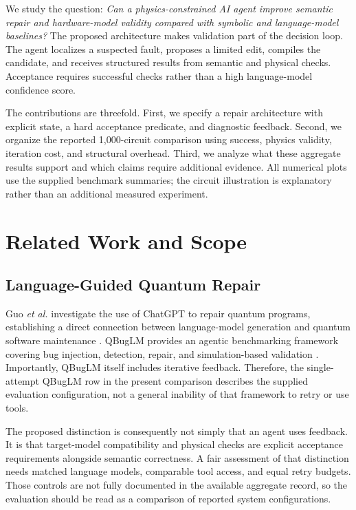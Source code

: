 \documentclass[conference]{IEEEtran}
\begin{document}
We study the question: \emph{Can a physics-constrained AI agent improve semantic repair and hardware-model validity compared with symbolic and language-model baselines?} The proposed architecture makes validation part of the decision loop. The agent localizes a suspected fault, proposes a limited edit, compiles the candidate, and receives structured results from semantic and physical checks. Acceptance requires successful checks rather than a high language-model confidence score.

The contributions are threefold. First, we specify a repair architecture with explicit state, a hard acceptance predicate, and diagnostic feedback. Second, we organize the reported 1,000-circuit comparison using success, physics validity, iteration cost, and structural overhead. Third, we analyze what these aggregate results support and which claims require additional evidence. All numerical plots use the supplied benchmark summaries; the circuit illustration is explanatory rather than an additional measured experiment.

\section{Related Work and Scope}
\subsection{Language-Guided Quantum Repair}
Guo \emph{et al.} investigate the use of ChatGPT to repair quantum programs, establishing a direct connection between language-model generation and quantum software maintenance \cite{guo2024repairing}. QBugLM provides an agentic benchmarking framework covering bug injection, detection, repair, and simulation-based validation \cite{pham2026qbuglm}. Importantly, QBugLM itself includes iterative feedback. Therefore, the single-attempt QBugLM row in the present comparison describes the supplied evaluation configuration, not a general inability of that framework to retry or use tools.

The proposed distinction is consequently not simply that an agent uses feedback. It is that target-model compatibility and physical checks are explicit acceptance requirements alongside semantic correctness. A fair assessment of that distinction needs matched language models, comparable tool access, and equal retry budgets. Those controls are not fully documented in the available aggregate record, so the evaluation should be read as a comparison of reported system configurations.
\end{document}
